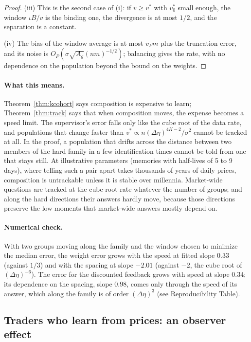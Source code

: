 \begin{proof}
(iii) This is the second case of (i): if $v\ge v^*$ with $v^*_0$ small enough, the window $\iota B/v$ is the binding one, the divergence is at most $1/2$, and the separation is a constant.

(iv) The bias of the window average is at most $v_Fm$ plus the truncation error, and its noise is $O_P(\sigma\sqrt{A_g}(nm)^{-1/2})$; balancing gives the rate, with no dependence on the population beyond the bound on the weights.
\end{proof}

\paragraph{What this means.} Theorem~\ref{thm:kcohort} says composition is expensive to learn; Theorem~\ref{thm:track} says that when composition moves, the expense becomes a speed limit. The supervisor's error falls only like the cube root of the data rate, and populations that change faster than $v^*\propto n(\Delta\eta)^{4K-2}/\sigma^2$ cannot be tracked at all. In the proof, a population that drifts across the distance between two members of the hard family in a few identification times cannot be told from one that stays still. At illustrative parameters (memories with half-lives of 5 to 9 days), where telling such a pair apart takes thousands of years of daily prices, composition is untrackable unless it is stable over millennia. Market-wide questions are tracked at the cube-root rate whatever the number of groups; and along the hard directions their answers hardly move, because those directions preserve the low moments that market-wide answers mostly depend on.

\paragraph{Numerical check.} With two groups moving along the family and the window chosen to minimize the median error, the weight error grows with the speed at fitted slope $0.33$ (against $1/3$) and with the spacing at slope $-2.01$ (against $-2$, the cube root of $(\Delta\eta)^{-6}$). The error for the discounted feedback grows with speed at slope $0.34$; its dependence on the spacing, slope $0.98$, comes only through the speed of its answer, which along the family is of order $(\Delta\eta)^3$ (see Reproducibility Table).

\subsection{Traders who learn from prices: an observer effect}

